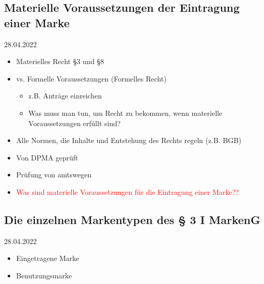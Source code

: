\documentclass{report}
\begin{document}
\subsection{Materielle Voraussetzungen der Eintragung einer Marke}
28.04.2022
\begin{itemize}
	\item Materielles Recht §3 und §8
	\item vs. Formelle Voraussetzungen (Formelles Recht)
	\begin{itemize}
		\item z.B. Anträge einreichen
		\item Was muss man tun, um Recht zu bekommen, wenn materielle Voraussetzungen erfüllt sind?
	\end{itemize}
	\item Alle Normen, die Inhalte und Entstehung des Rechts regeln (z.B. BGB)
	\item Von DPMA geprüft
	\item Prüfung von amtswegen
	\item \textcolor{red}{Was sind materielle Voraussetzungen für die Eintragung einer Marke??}
\end{itemize}

\subsection{Die einzelnen Markentypen des § 3 I MarkenG}
28.04.2022
\begin{itemize}
	\item Eingetragene Marke
	\item Benutzungsmarke
\end{itemize}
\end{document}
